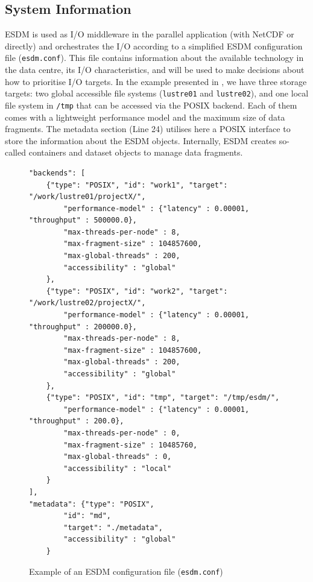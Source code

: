 \documentclass{superfri}
\begin{document}
\subsection{System Information}

ESDM is used as I/O middleware in the parallel application (with NetCDF or directly) and orchestrates the I/O according to a simplified ESDM configuration file (\texttt{esdm.conf}).
This file contains information about the available technology in the data centre, its I/O characteristics, and will be used to make decisions about how to prioritise I/O targets.
In the example presented in , we have three storage targets: two global accessible file systems (\texttt{lustre01} and \texttt{lustre02}), and one local file system in \texttt{/tmp} that can be accessed via the POSIX backend.
Each of them comes with a lightweight performance model and the maximum size of data fragments.
The metadata section (Line 24) utilises here a POSIX interface to store the information about the ESDM objects. Internally, ESDM creates so-called containers and dataset objects to manage data fragments.

\begin{figure}[!ht]

\begin{lstlisting}
"backends": [
    {"type": "POSIX", "id": "work1", "target": "/work/lustre01/projectX/",
        "performance-model" : {"latency" : 0.00001, "throughput" : 500000.0},
        "max-threads-per-node" : 8,
        "max-fragment-size" : 104857600,
        "max-global-threads" : 200,
        "accessibility" : "global"
    },
    {"type": "POSIX", "id": "work2", "target": "/work/lustre02/projectX/",
        "performance-model" : {"latency" : 0.00001, "throughput" : 200000.0},
        "max-threads-per-node" : 8,
        "max-fragment-size" : 104857600,
        "max-global-threads" : 200,
        "accessibility" : "global"
    },
    {"type": "POSIX", "id": "tmp", "target": "/tmp/esdm/",
        "performance-model" : {"latency" : 0.00001, "throughput" : 200.0},
        "max-threads-per-node" : 0,
        "max-fragment-size" : 10485760,
        "max-global-threads" : 0,
        "accessibility" : "local"
    }
],
"metadata": {"type": "POSIX",
        "id": "md",
        "target": "./metadata",
        "accessibility" : "global"
    }
\end{lstlisting}

\caption{Example of an ESDM configuration file (\texttt{esdm.conf})}
\label{lst:esdm.conf}
\end{figure}
\end{document}
